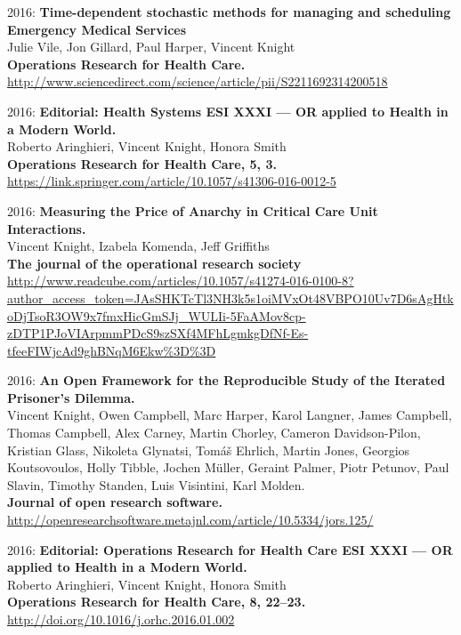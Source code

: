 \documentclass[10pt]{res} %
\begin{document}
\begin{resume}
\begin{etaremune}
\item
2016: \textbf{Time-dependent stochastic methods for managing and scheduling Emergency Medical Services}\\
Julie Vile, Jon Gillard, Paul Harper, Vincent Knight
\\
\textbf{Operations Research for Health Care.}
\\
\url{http://www.sciencedirect.com/science/article/pii/S2211692314200518}
\\

\item
2016: \textbf{Editorial: Health Systems ESI XXXI — OR applied to Health in a Modern World.}\\
Roberto Aringhieri, Vincent Knight, Honora Smith
\\
\textbf{Operations Research for Health Care, 5, 3.}
\\
\url{https://link.springer.com/article/10.1057/s41306-016-0012-5}
\\

\item
2016: \textbf{Measuring the Price of Anarchy in Critical Care Unit Interactions.}\\
Vincent Knight, Izabela Komenda, Jeff Griffiths
\\
\textbf{The journal of the operational research society}
\\
\url{http://www.readcube.com/articles/10.1057/s41274-016-0100-8?author_access_token=JAsSHKTcTl3NH3k5s1oiMVxOt48VBPO10Uv7D6sAgHtkoDjTsoR3OW9x7fmxHicGmSJj_WULIi-5FaAMov8cp-zDTP1PJoVIArpmmPDcS9szSXf4MFhLgmkgDfNf-Es-tfeeFIWjcAd9ghBNqM6Ekw%3D%3D}
\\

\item
2016: \textbf{An Open Framework for the Reproducible Study of the Iterated Prisoner’s Dilemma.}\\
Vincent Knight, Owen Campbell, Marc Harper, Karol Langner, James Campbell, Thomas Campbell, Alex Carney, Martin Chorley, Cameron Davidson-Pilon, Kristian Glass, Nikoleta Glynatsi, Tomáš Ehrlich, Martin Jones, Georgios Koutsovoulos, Holly Tibble, Jochen Müller, Geraint Palmer, Piotr Petunov, Paul Slavin, Timothy Standen, Luis Visintini, Karl Molden.
\\
\textbf{Journal of open research software.}
\\
\url{http://openresearchsoftware.metajnl.com/article/10.5334/jors.125/}
\\

\item
2016: \textbf{Editorial: Operations Research for Health Care ESI XXXI — OR applied to Health in a Modern World.}\\
Roberto Aringhieri, Vincent Knight, Honora Smith
\\
\textbf{Operations Research for Health Care, 8, 22–23.}
\\
\url{http://doi.org/10.1016/j.orhc.2016.01.002}
\\


\end{etaremune}
\end{resume}
\end{document}

